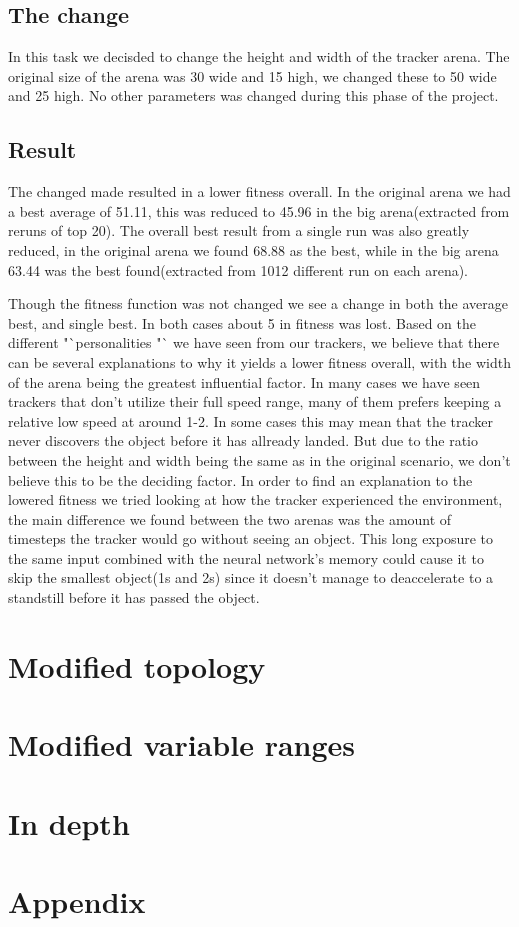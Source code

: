 \documentclass[10pt]{article}
\begin{document}
	\subsection{The change}
		In this task we decisded to change the height and width of the tracker arena. The original size of the arena was 30 wide and 15 high, we changed these to 50 wide and 25 high. No other parameters was changed during this phase of the project. 
	\subsection{Result}
		The changed made resulted in a lower fitness overall. In the original arena we had a best average of 51.11, this was reduced to 45.96 in the big arena(extracted from reruns of top 20). The overall best result from a single run was also greatly reduced, in the original arena we found 68.88 as the best, while in the big arena 63.44 was the best found(extracted from 1012 different run on each arena). 
		
		Though the fitness function was not changed we see a change in both the average best, and single best. In both cases about 5 in fitness was lost. Based on the different "`personalities "` we have seen from our trackers, we believe that there can be several explanations to why it yields a lower fitness overall, with the width of the arena being the greatest influential factor. In many cases we have seen trackers that don't utilize their full speed range, many of them prefers keeping a relative low speed at around 1-2. In some cases this may mean that the tracker never discovers the object before it has allready landed. But due to the ratio between the height and width being the same as in the original scenario, we don't believe this to be the deciding factor. In order to find an explanation to the lowered fitness we tried looking at how the tracker experienced the environment, the main difference we found between the two arenas was the amount of timesteps the tracker would go without seeing an object. This long exposure to the same input combined with the neural network's memory could cause it to skip the smallest object(1s and 2s) since it doesn't manage to deaccelerate to a standstill before it has passed the object. 
		
\section{Modified topology}
	
\section{Modified variable ranges}
\section{In depth}
\section{Appendix}
	
\end{document}
